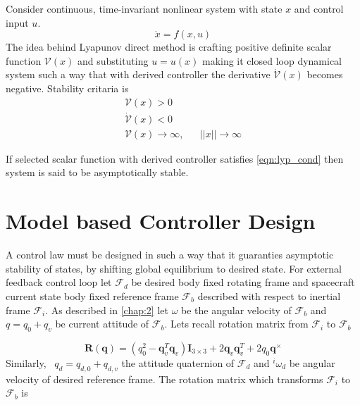 Consider continuous, time-invariant nonlinear system with state $\displaystyle x$ and control input $\displaystyle u$.
\begin{equation*}
\dot{x} =f( x,u)
\end{equation*}
The idea behind Lyapunov direct method is crafting positive definite scalar function $\displaystyle \mathcal{V}( x)$ and substituting $\displaystyle u=u( x)$ making it closed loop dynamical system such a way that with derived controller the derivative $\displaystyle \dot{\mathcal{V}}( x)$ becomes negative. Stability critaria is
\begin{equation}
 \begin{aligned}
\mathcal{V}( x)  >0 & & \\
\dot{\mathcal{V}}( x) < 0 & & \\
\mathcal{V}( x)\rightarrow \infty , & & ||x||\rightarrow \infty 
\end{aligned}
\label{eqn:lyp_cond}
\end{equation}


If selected scalar function with derived controller satisfies \autoref{eqn:lyp_cond} then system is said to be asymptotically stable. 



\section{Model based Controller Design}
A control law must be designed in such a way that it guaranties asymptotic stability of states, by shifting global equilibrium to desired state. For external feedback control loop let $\displaystyle \mathcal{F}_{d}$ be desired body fixed rotating frame and spacecraft current state body fixed reference frame $\displaystyle \mathcal{F}_{b}$ described with respect to inertial frame $\displaystyle \mathcal{F}_{i}$. As described in \autoref{chap:2} let $\displaystyle \omega $ be the angular velocity of $\displaystyle \mathcal{F}_{b}$ and $\displaystyle q=q_{0} +q_{v}$ be current attitude of $\displaystyle \mathcal{F}_{b}$. Lets recall rotation matrix from $\displaystyle \mathcal{F}_{i}$ to $\displaystyle \mathcal{F}_{b}$

\begin{equation}
\mathbf{R} (\mathbf{q} )=\left( q^{2}_{0} -\mathbf{q}^{T}_{v}\mathbf{q}_{v}\right)\mathbf{I}_{3\times 3} +2\mathbf{q}_{v}\mathbf{q}^{T}_{v} +2q_{0}\mathbf{q}^{\times }
\end{equation}Similarly, \ $\displaystyle q_{d} =q_{d,0} +q_{d,v}$ the attitude quaternion of $\displaystyle \mathcal{F}_{d}$ and $\displaystyle ^{i} \omega _{d}$ be angular velocity of desired reference frame. The rotation matrix which transforms $\displaystyle \mathcal{F}_{i}$ to $\displaystyle \mathcal{F}_{b}$ is


